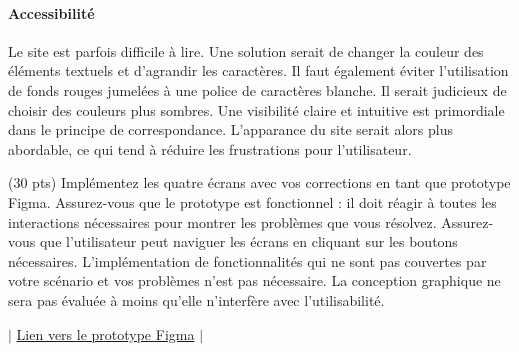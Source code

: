 \documentclass[9pt]{report}
\begin{document}
\begin{multicols*}{2}
\paragraph{Accessibilité}
Le site est parfois difficile à lire. Une solution serait de changer la couleur des éléments textuels et d'agrandir les caractères. Il faut 
également éviter l'utilisation de fonds rouges jumelées à une police de 
caractères blanche. Il serait judicieux de choisir des couleurs plus sombres. Une visibilité claire et intuitive est primordiale dans le principe de correspondance. L'apparance du site serait alors plus abordable, ce qui tend 
à réduire les frustrations pour l’utilisateur.

\begin{Exercice}{(30 pts)}{}
 Implémentez les quatre écrans avec vos corrections en tant que prototype Figma. Assurez-vous
que le prototype est fonctionnel : il doit réagir à toutes les interactions nécessaires pour montrer les
problèmes que vous résolvez. Assurez-vous que l’utilisateur peut naviguer les écrans en cliquant
sur les boutons nécessaires. L’implémentation de fonctionnalités qui ne sont pas couvertes par votre
scénario et vos problèmes n’est pas nécessaire.
La conception graphique ne sera pas évaluée à moins qu’elle n’interfère avec l’utilisabilité.   
\end{Exercice}

\begin{center}
  $\Big|$ \href{https://www.figma.com/proto/ljLKsuKg3fSQsX0puWfWj6/Galactic_Spiritv4?page-id=0%3A1&node-id=2-1062&starting-point-node-id=1%3A32&t=gDC3pM3wJifRLpeM-1&mode=design}{Lien vers le prototype Figma} $\Big|$ 
 
\end{center}

\end{multicols*}
\end{document}
